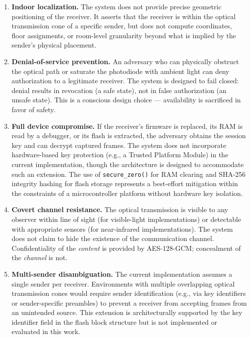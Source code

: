 \documentclass[conference]{IEEEtran}
\begin{document}
\begin{enumerate}
\item \textbf{Indoor localization.} The system does not provide precise geometric positioning of the receiver. It asserts that the receiver is within the optical transmission cone of a specific sender, but does not compute coordinates, floor assignments, or room-level granularity beyond what is implied by the sender's physical placement.

\item \textbf{Denial-of-service prevention.} An adversary who can physically obstruct the optical path or saturate the photodiode with ambient light can deny authorization to a legitimate receiver. The system is designed to fail closed: denial results in revocation (a safe state), not in false authorization (an unsafe state). This is a conscious design choice — availability is sacrificed in favor of safety.

\item \textbf{Full device compromise.} If the receiver's firmware is replaced, its RAM is read by a debugger, or its flash is extracted, the adversary obtains the session key and can decrypt captured frames. The system does not incorporate hardware-based key protection (e.g., a Trusted Platform Module) in the current implementation, though the architecture is designed to accommodate such an extension. The use of \texttt{secure\_zero()} for RAM clearing and SHA-256 integrity hashing for flash storage represents a best-effort mitigation within the constraints of a microcontroller platform without hardware key isolation.

\item \textbf{Covert channel resistance.} The optical transmission is visible to any observer within line of sight (for visible-light implementations) or detectable with appropriate sensors (for near-infrared implementations). The system does not claim to hide the existence of the communication channel. Confidentiality of the \emph{content} is provided by AES-128-GCM; concealment of the \emph{channel} is not.

\item \textbf{Multi-sender disambiguation.} The current implementation assumes a single sender per receiver. Environments with multiple overlapping optical transmission cones would require sender identification (e.g., via key identifiers or sender-specific preambles) to prevent a receiver from accepting frames from an unintended source. This extension is architecturally supported by the key identifier field in the flash block structure but is not implemented or evaluated in this work.
\end{enumerate}
\end{document}
